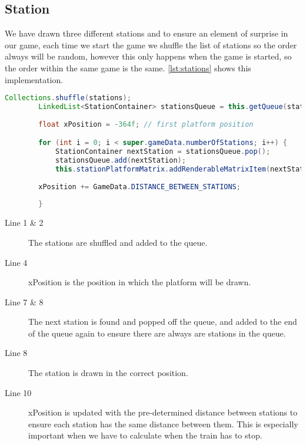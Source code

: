 \subsection{Station}

We have drawn three different stations and to ensure an element of surprise in our game, each time we start the game we shuffle the list of stations so the order always will be random, however this only happens when the game is started, so the order within the same game is the same.  \autoref{lst:stations} shows this implementation.
 
\begin{lstlisting}[language=java,firstnumber=1,caption={Smoke clouds getting reset based on time intervals},label=lst:stations]
        Collections.shuffle(stations);
        LinkedList<StationContainer> stationsQueue = this.getQueue(stations);
        
        float xPosition = -364f; // first platform position

        for (int i = 0; i < super.gameData.numberOfStations; i++) {
            StationContainer nextStation = stationsQueue.pop();
            stationsQueue.add(nextStation);
            this.stationPlatformMatrix.addRenderableMatrixItem(nextStation.station, new Coordinate(xPosition + nextStation.xOffset, nextStation.yOffset, 0f));
            
        xPosition += GameData.DISTANCE_BETWEEN_STATIONS;        
            
        }
\end{lstlisting}

\begin{description}
\item[Line 1 \& 2]  The stations are shuffled and added to the queue.
\item[Line 4] xPosition is the position in which the platform will be drawn. 
\item[Line 7 \& 8] The next station is found and popped off the queue, and added to the end of the queue again to ensure there are always are stations in the queue. 
\item[Line 8] The station is drawn in the correct position. 
\item[Line 10] xPosition is updated with the pre-determined distance between stations to ensure each station has the same distance between them. This is especially important when we have to calculate when the train has to stop. 
\end{description}

